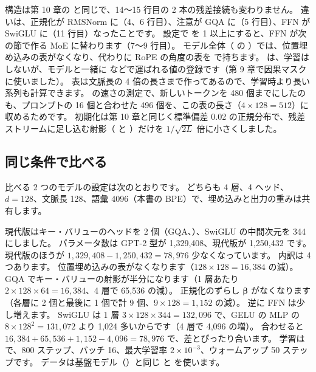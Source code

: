 
構造は第 10 章の  と同じで、14〜15 行目の 2 本の残差接続も変わりません。
違いは、正規化が RMSNorm に（4、6 行目）、注意が GQA に（5 行目）、FFN が SwiGLU に（11 行目）なったことです。
設定で  を 1 以上にすると、FFN が次の節で作る MoE に替わります（7〜9 行目）。
モデル全体（ の ）では、位置埋め込みの表がなくなり、代わりに RoPE の角度の表を  で持ちます。
 は、学習はしないが、モデルと一緒に  などで運ばれる値の登録です（第 9 章で因果マスクに使いました）。
表は文脈長の 4 倍の長さまで作ってあるので、学習時より長い系列も計算できます。
の速さの測定で、新しいトークンを 480 個までにしたのも、プロンプトの 16 個と合わせた 496 個を、この表の長さ（$4\times128=512$）に収めるためです。
初期化は第 10 章と同じく標準偏差 0.02 の正規分布で、残差ストリームに足し込む射影（ と ）だけを $1/\sqrt{2L}$ 倍に小さくしました。

\subsection*{同じ条件で比べる}

比べる 2 つのモデルの設定は次のとおりです。
どちらも 4 層、4 ヘッド、$d=128$、文脈長 128、語彙 4096（本書の BPE）で、埋め込みと出力の重みは共有します。


現代版はキー・バリューのヘッドを 2 個（GQA、）、SwiGLU の中間次元を 344 にしました。
パラメータ数は GPT-2 型が 1,329,408、現代版が 1,250,432 です。
現代版のほうが $1{,}329{,}408-1{,}250{,}432=78{,}976$ 少なくなっています。
内訳は 4 つあります。
位置埋め込みの表がなくなります（$128\times128=16{,}384$ の減）。
GQA でキー・バリューの射影が半分になります（1 層あたり $2\times128\times64=16{,}384$、4 層で 65,536 の減）。
正規化のずらし $\bm\beta$ がなくなります（各層に 2 個と最後に 1 個で計 9 個、$9\times128=1{,}152$ の減）。
逆に FFN は少し増えます。
SwiGLU は 1 層 $3\times128\times344=132{,}096$ で、GELU の MLP の $8\times128^2=131{,}072$ より 1,024 多いからです（4 層で 4,096 の増）。
合わせると $16{,}384+65{,}536+1{,}152-4{,}096=78{,}976$ で、差とぴったり合います。
学習は  で、800 ステップ、バッチ 16、最大学習率 $2\times10^{-3}$、ウォームアップ 50 ステップです。
データは基盤モデル（）と同じ  と  を使います。

